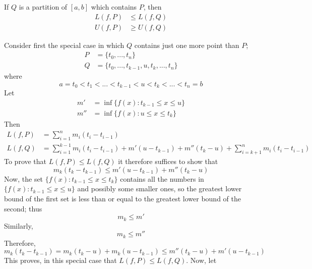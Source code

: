\documentclass[12pt]{report}
\begin{document}
\begin{lem}{}{}
    If $Q$ is a partition of $[a,b]$ which contains $P$, then \begin{align*}
        L(f,P) &\leq L(f,Q) \\
        U(f,P) &\geq U(f,Q)
    \end{align*}
\end{lem}
\begin{proof*}{}{}
    Consider first the special case in which $Q$ contains just one more point than $P$;\begin{align*}
        P &=\{t_0,...,t_n\} \\
        Q &= \{t_0,...,t_{k-1},u,t_k,...,t_n\}
    \end{align*}
    where $$a= t_0 < t_1 < ... < t_{k-1} < u < t_k < ... < t_n = b$$
    Let \begin{align*}
        m' &= \inf\{f(x):t_{k-1}\leq x \leq u\} \\
        m'' &= \inf\{f(x):u \leq x \leq t_k\}
    \end{align*}
    Then \begin{align*}
        L(f,P) &= \sum\limits_{i=1}^nm_i(t_i - t_{i-1}) \\
        L(f,Q) &= \sum\limits_{i=1}^{k-1}m_i(t_i - t_{i-1}) + m'(u-t_{k-1}) + m''(t_k-u) + \sum\limits_{i=k+1}^nm_i(t_i - t_{i-1})
    \end{align*}
    To prove that $L(f,P) \leq L(f,Q)$ it therefore suffices to show that \begin{equation*}
        m_k(t_k-t_{k-1}) \leq m'(u-t_{k-1}) + m''(t_k-u)
    \end{equation*}
    Now, the set $\{f(x):t_{k-1}\leq x \leq t_k\}$ contains all the numbers in $\{f(x):t_{k-1}\leq x \leq u\}$ and possibly some smaller        ones, so the greatest lower bound of the first set is less than or equal to the greatest lower bound of the second; thus                    \begin{equation*}
        m_k \leq m'
    \end{equation*}
    Similarly, \begin{equation*}
        m_k \leq m''
    \end{equation*}
    Therefore, \begin{equation*}
        m_k(t_k-t_{k-1}) = m_k(t_k-u)+m_k(u-t_{k-1}) \leq m''(t_k-u)+m'(u-t_{k-1})
    \end{equation*}
    This proves, in this special case that $L(f,P) \leq L(f,Q)$. Now, let \begin{align*}

\end{align*}
\end{proof*}
\end{document}
